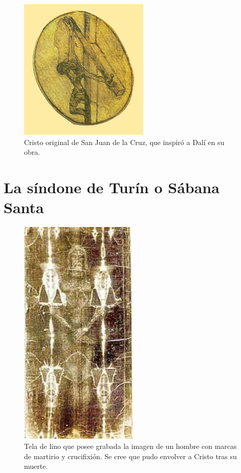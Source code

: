 \begin{figure}[H]
    \centering
    \includegraphics[width=0.55\textwidth]{sanju.jpg}
    \caption{Cristo original de San Juan de la Cruz, que inspiró a Dalí en su obra.} %
\end{figure}

\section{La síndone de Turín o Sábana Santa} \label{app:sindone}

\begin{figure}[H]
    \centering
    \includegraphics[width=0.5\textwidth]{sindone.jpg}
    \caption{Tela de lino que posee grabada la imagen de un hombre con marcas de martirio y crucifixión. Se cree que pudo envolver a Cristo tras su muerte.} %
\end{figure}